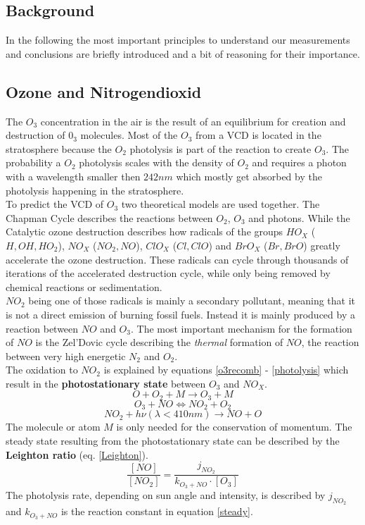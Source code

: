 \documentclass[12pt, english]{scrartcl} %
\begin{document}
\begin{multicols}{2}
\section{Background}
In the following the most important principles to understand our measurements and conclusions are briefly introduced and a bit of reasoning for their importance.
\subsection{Ozone and Nitrogendioxid}
The $O_3$ concentration in the air is the result of an equilibrium for creation and destruction of $0_3$ molecules. Most of the $O_3$ from a VCD is located in the stratosphere because the $O_2$ photolysis is part of the reaction to create $O_3$. The probability a $O_2$ photolysis scales with the density of $O_2$ and requires a photon with a wavelength smaller then $242nm$ which mostly get absorbed by the photolysis happening in the stratosphere.\\
To predict the VCD of $O_3$ two theoretical models are used together. The Chapman Cycle describes the reactions between $O_2$, $O_3$ and photons. While the Catalytic ozone destruction describes how radicals of the groups $HO_X$ ($H, OH, HO_2$), $NO_X$ ($NO_2,NO$), $ClO_X$ ($Cl, ClO$) and $BrO_X$ ($Br,BrO$) greatly accelerate the ozone destruction. These radicals can cycle through thousands of iterations of the accelerated destruction cycle, while only being removed by chemical reactions or sedimentation.\\
$NO_2$ being one of those radicals is mainly a secondary pollutant, meaning that it is not a direct emission of burning fossil fuels. Instead it is mainly produced by a reaction between $NO$ and $O_3$. The most important mechanism for the formation of $NO$ is the Zel'Dovic cycle describing the \textit{thermal} formation of $NO$, the reaction between very high energetic $N_2$ and $O_2$.\\
The oxidation to $NO_2$ is explained by equations \ref{o3recomb} - \ref{photolysis} which result in the \textbf{photostationary state} between $O_3$ and $NO_X$.
\begin{equation}\label{o3recomb}
O + O_2 + M \rightarrow O_3 + M 
\end{equation}
\begin{equation}\label{steady}
O_3 + NO \Longleftrightarrow NO_2 +O_2
\end{equation}
\begin{equation}\label{photolysis}
NO_2 + h\nu(\lambda < 410 nm) \rightarrow NO + O
\end{equation}
The molecule or atom $M$ is only needed for the conservation of momentum.
The steady state resulting from the photostationary state can be described by the \textbf{Leighton ratio} (eq. \ref{Leighton}).
\begin{equation}\label{Leighton}
\frac{[NO]}{[NO_2]} = \frac{j_{NO_2}}{k_{O_3+NO} \cdot [O_3] }
\end{equation}
The photolysis rate, depending on sun angle and intensity, is described by $j_{NO_2}$ and  $k_{O_3+NO}$ is the reaction constant in equation \ref{steady}.\\

\end{multicols}
\end{document}
